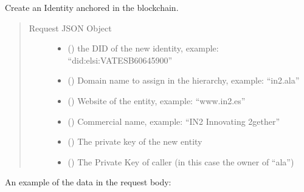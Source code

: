 \documentclass[a4paper,12pt,english]{sphinxhowto}
\begin{document}
\begin{fulllineitems}
\sphinxAtStartPar
Create an Identity anchored in the blockchain.
\begin{quote}\begin{description}
\item[{Request JSON Object}] \leavevmode\begin{itemize}
\item {} 
\sphinxAtStartPar
{} () \textendash{} the DID of the new identity, example: “did:elsi:VATES\sphinxhyphen{}B60645900”

\item {} 
\sphinxAtStartPar
{} () \textendash{} Domain name to assign in the hierarchy, example: “in2.ala”

\item {} 
\sphinxAtStartPar
{} () \textendash{} Website of the entity, example: “www.in2.es”

\item {} 
\sphinxAtStartPar
{} () \textendash{} Commercial name, example: “IN2 Innovating 2gether”

\item {} 
\sphinxAtStartPar
{} () \textendash{} The private key of the new entity

\item {} 
\sphinxAtStartPar
{} () \textendash{} The Private Key of caller (in this case the owner of “ala”)

\end{itemize}

\end{description}\end{quote}

\sphinxAtStartPar
An example of the data in the request body:


\end{fulllineitems}
\end{document}
